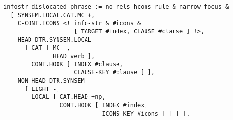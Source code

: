 \documentclass[a4paper]{article}
\begin{document}
{\small\begin{verbatim}
infostr-dislocated-phrase := no-rels-hcons-rule & narrow-focus &
  [ SYNSEM.LOCAL.CAT.MC +,
    C-CONT.ICONS <! info-str & #icons &
                    [ TARGET #index, CLAUSE #clause ] !>,
    HEAD-DTR.SYNSEM.LOCAL 
      [ CAT [ MC -,
              HEAD verb ],
        CONT.HOOK [ INDEX #clause,
                    CLAUSE-KEY #clause ] ],
    NON-HEAD-DTR.SYNSEM 
      [ LIGHT -,
        LOCAL [ CAT.HEAD +np,
                CONT.HOOK [ INDEX #index,
                            ICONS-KEY #icons ] ] ] ].
\end{verbatim}}
\end{document}
